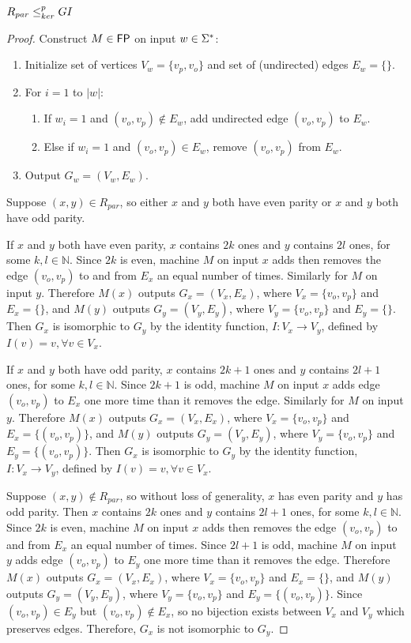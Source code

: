 \begin{theorem}\label{thm:rpar-gi}$R_{par}\leq^{p}_{ker} GI$\end{theorem}
\begin{proof}
  Construct $M\in {\ensuremath{\mathsf{FP}}}$ on input $w\in\Sigma^{*}$:
  \begin{enumerate}
  \item Initialize set of vertices $V_w=\{v_{p}, v_{o}\}$ and set of
    (undirected) edges $E_w=\{\}$.
  \item For $i=1$ to $|w|$:
    \begin{enumerate}
    \item If $w_i=1$ and $(v_{o}, v_{p})\notin E_w$, add undirected edge
      $(v_{o}, v_{p})$ to $E_w$.
    \item Else if $w_i=1$ and $(v_{o}, v_{p})\in E_w$, remove $(v_{o}, v_{p})$
      from $E_w$.
    \end{enumerate}
  \item Output $G_w=(V_w,E_w)$.
  \end{enumerate}

  Suppose $(x, y)\in R_{par}$, so either $x$ and $y$ both have even parity or
  $x$ and $y$ both have odd parity. 

  If $x$ and $y$ both have even parity, $x$ contains $2k$ ones and $y$ contains
  $2l$ ones, for some $k,l\in\mathbb{N}$. Since $2k$ is even, machine $M$ on
  input $x$ adds then removes the edge $(v_o, v_p)$ to and from $E_x$ an equal
  number of times. Similarly for $M$ on input $y$. Therefore $M(x)$ outputs
  $G_x=(V_x, E_x)$, where $V_x=\{v_o, v_p\}$ and $E_x=\{\}$, and $M(y)$ outputs
  $G_y=(V_y, E_y)$, where $V_y=\{v_o, v_p\}$ and $E_y=\{\}$. Then $G_x$ is
  isomorphic to $G_y$ by the identity function, $I:V_x\to V_y$, defined by
  $I(v)=v, \forall v\in V_x$.

  If $x$ and $y$ both have odd parity, $x$ contains $2k+1$ ones and $y$
  contains $2l+1$ ones, for some $k,l\in\mathbb{N}$. Since $2k+1$ is odd,
  machine $M$ on input $x$ adds edge $(v_o, v_p)$ to $E_x$ one more time than
  it removes the edge. Similarly for $M$ on input $y$. Therefore $M(x)$ outputs
  $G_x=(V_x, E_x)$, where $V_x=\{v_o, v_p\}$ and $E_x=\{(v_o, v_p)\}$, and
  $M(y)$ outputs $G_y=(V_y, E_y)$, where $V_y=\{v_o, v_p\}$ and $E_y=\{(v_o,
  v_p)\}$. Then $G_x$ is isomorphic to $G_y$ by the identity function,
  $I:V_x\to V_y$, defined by $I(v)=v, \forall v\in V_x$.

  Suppose $(x, y)\notin R_{par}$, so without loss of generality, $x$ has even
  parity and $y$ has odd parity. Then $x$ contains $2k$ ones and $y$ contains
  $2l+1$ ones, for some $k,l\in\mathbb{N}$. Since $2k$ is even, machine $M$ on
  input $x$ adds then removes the edge $(v_o, v_p)$ to and from $E_x$ an equal
  number of times. Since $2l+1$ is odd, machine $M$ on input $y$ adds edge
  $(v_o, v_p)$ to $E_y$ one more time than it removes the edge. Therefore
  $M(x)$ outputs $G_x=(V_x, E_x)$, where $V_x=\{v_o, v_p\}$ and $E_x=\{\}$, and
  $M(y)$ outputs $G_y=(V_y, E_y)$, where $V_y=\{v_o, v_p\}$ and $E_y=\{(v_o,
  v_p)\}$. Since $(v_o, v_p)\in E_y$ but $(v_o, v_p)\notin E_x$, so no
  bijection exists between $V_x$ and $V_y$ which preserves edges. Therefore,
  $G_x$ is not isomorphic to $G_y$.


\end{proof}
